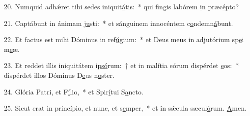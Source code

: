 20. Numquid adhǽret tibi sedes iniquit\uline{á}tis:~* qui fingis labórem \uline{i}n præc\uline{é}pto?\par 
21. Captábunt in ánimam j\uline{u}sti:~* et sánguinem innocéntem c\uline{o}ndemn\uline{á}bunt.\par 
22. Et factus est mihi Dóminus in ref\uline{ú}gium:~* et Deus meus in adjutórium sp\uline{e}i m\uline{e}æ.\par 
23. Et reddet illis iniquitátem i\uline{psó}rum:~† et in malítia eórum dispérdet \uline{e}os:~* dispérdet illos Dóminus D\uline{e}us n\uline{o}ster.\par 
24. Glória Patri, et F\uline{í}lio,~* et Spir\uline{í}tui S\uline{a}ncto.\par 
25. Sicut erat in princípio, et nunc, et s\uline{e}mper,~* et in sǽcula sæcul\uline{ó}rum. \uline{A}men.\par 
